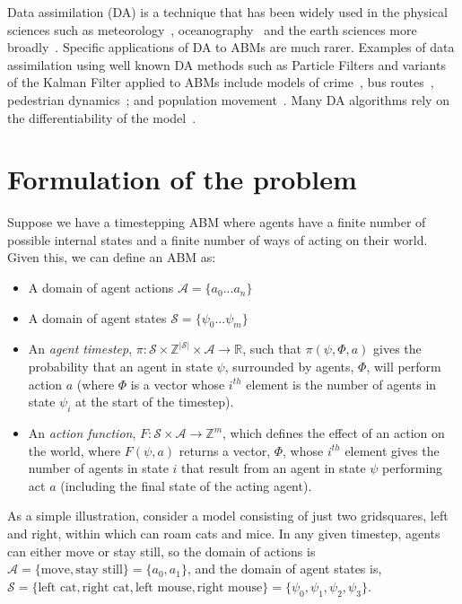 \documentclass{article}
\begin{document}
Data assimilation (DA) is a technique that has been widely used in the physical sciences such as meteorology~\cite{kalnay_atmospheric_2003}, oceanography~\cite{bertino_sequential_2003} and the earth sciences more broadly~\cite{reichle_data_2008}. Specific applications of DA to ABMs are much rarer. Examples of data assimilation using well known DA methods such as Particle Filters and variants of the Kalman Filter applied to ABMs include models of crime~\cite{lloyd_exploring_2016}, bus routes~\cite{kieu_dealing_2020}, pedestrian dynamics~\cite{wang_data_2015, ward_dynamic_2016, clay_realtime_2020, malleson_simulating_2020};
and population movement~\cite{lueck_who_2019}. Many DA algorithms rely on the differentiability of the model~\cite{lewis_dynamic_2006}.

\section{Formulation of the problem}


Suppose we have a timestepping ABM where agents have a finite number of possible internal states and a finite number of ways of acting on their world. Given this, we can define an ABM as:
\begin{itemize}
	\item A domain of agent actions $\mathcal{A} =\{ a_0 ... a_n \}$
	
	\item A domain of agent states $\mathcal{S} = \{\psi_0 ... \psi_m\}$
	
	\item An \textit{agent timestep}, $\pi : \mathcal{S}\times\mathbb{Z}^{|\mathcal{S}|}\times\mathcal{A} \to \mathbb{R}$, such that $\pi(\psi,\Phi,a)$ gives the probability that an agent in state $\psi$, surrounded by agents, $\Phi$, will perform action $a$ (where $\Phi$ is a vector whose $i^{th}$ element is the number of agents in state $\psi_i$ at the start of the timestep).
	
	\item An \textit{action function}, $F: \mathcal{S} \times \mathcal{A} \to \mathbb{Z}^m$, which defines the effect of an action on the world, where $F(\psi, a)$ returns a vector, $\Phi$, whose $i^{th}$ element gives the number of agents in state $i$ that result from an agent in state $\psi$ performing act $a$ (including the final state of the acting agent).
\end{itemize}

As a simple illustration, consider a model consisting of just two gridsquares, left and right, within which can roam cats and mice. In any given timestep, agents can either move or stay still, so the domain of actions is $\mathcal{A} = \{\textrm{move}, \textrm{stay still}\} = \{a_0, a_1\}$, and the domain of agent states is, $\mathcal{S} = \{\textrm{left cat}, \textrm{right cat}, \textrm{left mouse}, \textrm{right mouse} \} = \{\psi_0, \psi_1, \psi_2, \psi_3\}$.
\end{document}
